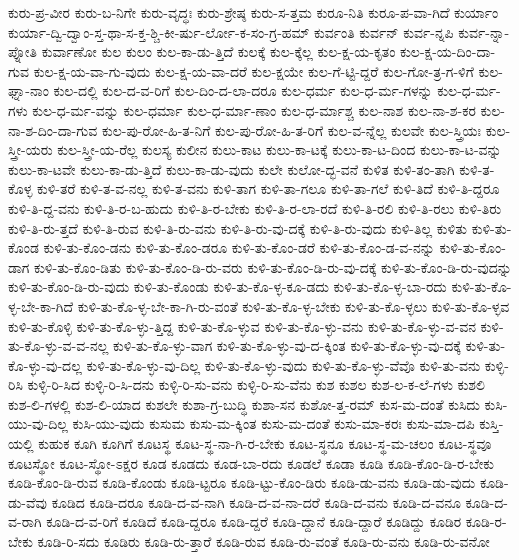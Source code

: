 {ಕುರು-ಪ್ರ-ವೀರ
ಕುರು-ಬ-ನಿಗೇ
ಕುರು-ವೃದ್ಧಃ
ಕುರು-ಶ್ರೇಷ್ಠ
ಕುರು-ಸ-ತ್ತಮ
ಕುರೂ-ನಿತಿ
ಕುರೂ-ಪ-ವಾ-ಗಿದೆ
ಕುರ್ಯಾಂ
ಕುರ್ಯಾ-ದ್ವಿ-ದ್ವಾಂ-ಸ್ತ-ಥಾ-ಸ-ಕ್ತ-ಶ್ಚಿ-ಕೀ-ರ್ಷು-ರ್ಲೋ-ಕ-ಸಂ-ಗ್ರ-ಹಮ್
ಕುರ್ವಂತಿ
ಕುರ್ವನ್
ಕುರ್ವ-ನ್ನಪಿ
ಕುರ್ವ-ನ್ನಾ-ಪ್ನೋತಿ
ಕುರ್ವಾಣೋ
ಕುಲ
ಕುಲಂ
ಕುಲ-ಕಾ-ಡು-ತ್ತಿದೆ
ಕುಲಕ್ಕೆ
ಕುಲ-ಕ್ಕೆಲ್ಲ
ಕುಲ-ಕ್ಷ-ಯ-ಕೃತಂ
ಕುಲ-ಕ್ಷ-ಯ-ದಿಂ-ದಾ-ಗುವ
ಕುಲ-ಕ್ಷ-ಯ-ವಾ-ಗು-ವುದು
ಕುಲ-ಕ್ಷ-ಯ-ವಾ-ದರೆ
ಕುಲ-ಕ್ಷಯೇ
ಕುಲ-ಗೆ-ಟ್ಟಿ-ದ್ದರೆ
ಕುಲ-ಗೋ-ತ್ರ-ಗ-ಳಿಗೆ
ಕುಲ-ಘ್ನಾ-ನಾಂ
ಕುಲ-ದಲ್ಲಿ
ಕುಲ-ದ-ವ-ರಿಗೆ
ಕುಲ-ದಿಂ-ದ-ಲಾ-ದರೂ
ಕುಲ-ಧರ್ಮ
ಕುಲ-ಧ-ರ್ಮ-ಗಳನ್ನು
ಕುಲ-ಧ-ರ್ಮ-ಗಳು
ಕುಲ-ಧ-ರ್ಮ-ವನ್ನು
ಕುಲ-ಧರ್ಮಾ
ಕುಲ-ಧ-ರ್ಮಾ-ಣಾಂ
ಕುಲ-ಧ-ರ್ಮಾಶ್ಚ
ಕುಲ-ನಾಶ
ಕುಲ-ನಾ-ಶ-ಕರ
ಕುಲ-ನಾ-ಶ-ದಿಂ-ದಾ-ಗುವ
ಕುಲ-ಪು-ರೋ-ಹಿ-ತ-ನಿಗೆ
ಕುಲ-ಪು-ರೋ-ಹಿ-ತ-ರಿಗೆ
ಕುಲ-ವ-ನ್ನೆಲ್ಲ
ಕುಲವೇ
ಕುಲ-ಸ್ತ್ರಿಯಃ
ಕುಲ-ಸ್ತ್ರೀ-ಯರು
ಕುಲ-ಸ್ತ್ರೀ-ಯ-ರೆಲ್ಲ
ಕುಲಸ್ಯ
ಕುಲೀನ
ಕುಲು-ಕಾಟ
ಕುಲು-ಕಾ-ಟಕ್ಕೆ
ಕುಲು-ಕಾ-ಟ-ದಿಂದ
ಕುಲು-ಕಾ-ಟ-ವನ್ನು
ಕುಲು-ಕಾ-ಟವೇ
ಕುಲು-ಕಾ-ಡು-ತ್ತಿದೆ
ಕುಲು-ಕಾ-ಡು-ವುದು
ಕುಲೇ
ಕುಲೋ-ದ್ಭ-ವನೆ
ಕುಳಿತ
ಕುಳಿ-ತಂ-ತಾಗಿ
ಕುಳಿ-ತ-ಕೊಳ್ಳ
ಕುಳಿ-ತರೆ
ಕುಳಿ-ತ-ವ-ನಲ್ಲ
ಕುಳಿ-ತ-ವನು
ಕುಳಿ-ತಾಗ
ಕುಳಿ-ತಾ-ಗಲೂ
ಕುಳಿ-ತಾ-ಗಲೆ
ಕುಳಿ-ತಿದೆ
ಕುಳಿ-ತಿ-ದ್ದರೂ
ಕುಳಿ-ತಿ-ದ್ದ-ವನು
ಕುಳಿ-ತಿ-ರ-ಬ-ಹುದು
ಕುಳಿ-ತಿ-ರ-ಬೇಕು
ಕುಳಿ-ತಿ-ರ-ಲಾ-ರದೆ
ಕುಳಿ-ತಿ-ರಲಿ
ಕುಳಿ-ತಿ-ರಲು
ಕುಳಿ-ತಿರು
ಕುಳಿ-ತಿ-ರು-ತ್ತದೆ
ಕುಳಿ-ತಿ-ರುವ
ಕುಳಿ-ತಿ-ರು-ವನು
ಕುಳಿ-ತಿ-ರು-ವು-ದಕ್ಕೆ
ಕುಳಿ-ತಿ-ರು-ವುದು
ಕುಳಿ-ತಿಲ್ಲ
ಕುಳಿತು
ಕುಳಿ-ತು-ಕೊಂಡ
ಕುಳಿ-ತು-ಕೊಂ-ಡನು
ಕುಳಿ-ತು-ಕೊಂ-ಡರೂ
ಕುಳಿ-ತು-ಕೊಂ-ಡರೆ
ಕುಳಿ-ತು-ಕೊಂ-ಡ-ವ-ನನ್ನು
ಕುಳಿ-ತು-ಕೊಂ-ಡಾಗ
ಕುಳಿ-ತು-ಕೊಂ-ಡಿತು
ಕುಳಿ-ತು-ಕೊಂ-ಡಿ-ರು-ವರು
ಕುಳಿ-ತು-ಕೊಂ-ಡಿ-ರು-ವು-ದಕ್ಕೆ
ಕುಳಿ-ತು-ಕೊಂ-ಡಿ-ರು-ವುದನ್ನು
ಕುಳಿ-ತು-ಕೊಂ-ಡಿ-ರು-ವುದು
ಕುಳಿ-ತು-ಕೊಂಡು
ಕುಳಿ-ತು-ಕೊ-ಳ್ಳ-ಕೂ-ಡದು
ಕುಳಿ-ತು-ಕೊ-ಳ್ಳ-ಬಾ-ರದು
ಕುಳಿ-ತು-ಕೊ-ಳ್ಳ-ಬೇ-ಕಾ-ಗಿದೆ
ಕುಳಿ-ತು-ಕೊ-ಳ್ಳ-ಬೇ-ಕಾ-ಗಿ-ರು-ವಂತೆ
ಕುಳಿ-ತು-ಕೊ-ಳ್ಳ-ಬೇಕು
ಕುಳಿ-ತು-ಕೊ-ಳ್ಳಲು
ಕುಳಿ-ತು-ಕೊ-ಳ್ಳವ
ಕುಳಿ-ತು-ಕೊಳ್ಳಿ
ಕುಳಿ-ತು-ಕೊ-ಳ್ಳು-ತ್ತಿದ್ದ
ಕುಳಿ-ತು-ಕೊ-ಳ್ಳುವ
ಕುಳಿ-ತು-ಕೊ-ಳ್ಳು-ವನು
ಕುಳಿ-ತು-ಕೊ-ಳ್ಳು-ವ-ವನ
ಕುಳಿ-ತು-ಕೊ-ಳ್ಳು-ವ-ವ-ನಲ್ಲ
ಕುಳಿ-ತು-ಕೊ-ಳ್ಳು-ವಾಗ
ಕುಳಿ-ತು-ಕೊ-ಳ್ಳು-ವು-ದ-ಕ್ಕಿಂತ
ಕುಳಿ-ತು-ಕೊ-ಳ್ಳು-ವು-ದಕ್ಕೆ
ಕುಳಿ-ತು-ಕೊ-ಳ್ಳು-ವು-ದಲ್ಲ
ಕುಳಿ-ತು-ಕೊ-ಳ್ಳು-ವು-ದಿಲ್ಲ
ಕುಳಿ-ತು-ಕೊ-ಳ್ಳು-ವುದು
ಕುಳಿ-ತು-ಕೊ-ಳ್ಳು-ವೆವೊ
ಕುಳಿ-ತು-ವನು
ಕುಳ್ಳಿ-ರಿಸಿ
ಕುಳ್ಳಿ-ರಿ-ಸಿದ
ಕುಳ್ಳಿ-ರಿ-ಸಿ-ದನು
ಕುಳ್ಳಿ-ರಿ-ಸು-ವನು
ಕುಳ್ಳಿ-ರಿ-ಸು-ವೆನು
ಕುಶ
ಕುಶಲ
ಕುಶ-ಲ-ಕ-ಲೆ-ಗಳು
ಕುಶಲಿ
ಕುಶ-ಲಿ-ಗಳಲ್ಲಿ
ಕುಶ-ಲಿ-ಯಾದ
ಕುಶಲೇ
ಕುಶಾ-ಗ್ರ-ಬುದ್ಧಿ
ಕುಶಾ-ಸನ
ಕುಶೋ-ತ್ತ-ರಮ್
ಕುಸ-ಮ-ದಂತೆ
ಕುಸಿದು
ಕುಸಿ-ಯು-ವು-ದಿಲ್ಲ
ಕುಸಿ-ಯು-ವುದು
ಕುಸುಮ
ಕುಸು-ಮ-ಕ್ಕಿಂತ
ಕುಸು-ಮ-ದಂತೆ
ಕುಸು-ಮಾ-ಕರಃ
ಕುಸು-ಮಾ-ದಪಿ
ಕುಸ್ತಿ-ಯಲ್ಲಿ
ಕುಹುಕ
ಕೂಗಿ
ಕೂಗಿಗೆ
ಕೂಟಸ್ಥ
ಕೂಟ-ಸ್ಥ-ನಾ-ಗಿ-ರ-ಬೇಕು
ಕೂಟ-ಸ್ಥನೂ
ಕೂಟ-ಸ್ಥ-ಮ-ಚಲಂ
ಕೂಟ-ಸ್ಥವೂ
ಕೂಟಸ್ಥೋ
ಕೂಟ-ಸ್ಥೋ-ಽಕ್ಷರ
ಕೂಡ
ಕೂಡದು
ಕೂಡ-ಬಾ-ರದು
ಕೂಡಲೆ
ಕೂಡಾ
ಕೂಡಿ
ಕೂಡಿ-ಕೊಂ-ಡಿ-ರ-ಬೇಕು
ಕೂಡಿ-ಕೊಂ-ಡಿ-ರುವ
ಕೂಡಿ-ಕೊಂಡು
ಕೂಡಿ-ಟ್ಟರೂ
ಕೂಡಿ-ಟ್ಟು-ಕೊಂ-ಡಿರು
ಕೂಡಿ-ಡು-ವನು
ಕೂಡಿ-ಡು-ವುದು
ಕೂಡಿ-ಡು-ವೆವು
ಕೂಡಿದ
ಕೂಡಿ-ದರೂ
ಕೂಡಿ-ದ-ವ-ನಾಗಿ
ಕೂಡಿ-ದ-ವ-ನಾ-ದರೆ
ಕೂಡಿ-ದ-ವನು
ಕೂಡಿ-ದ-ವನೂ
ಕೂಡಿ-ದ-ವ-ರಾಗಿ
ಕೂಡಿ-ದ-ವ-ರಿಗೆ
ಕೂಡಿದೆ
ಕೂಡಿ-ದ್ದರೂ
ಕೂಡಿ-ದ್ದರೆ
ಕೂಡಿ-ದ್ದಾನೆ
ಕೂಡಿ-ದ್ದಾರೆ
ಕೂಡಿದ್ದು
ಕೂಡಿರ
ಕೂಡಿ-ರ-ಬೇಕು
ಕೂಡಿ-ರಿ-ಸದು
ಕೂಡಿರು
ಕೂಡಿ-ರು-ತ್ತಾರೆ
ಕೂಡಿ-ರುವ
ಕೂಡಿ-ರು-ವಂತೆ
ಕೂಡಿ-ರು-ವನು
ಕೂಡಿ-ರು-ವನೋ
}
